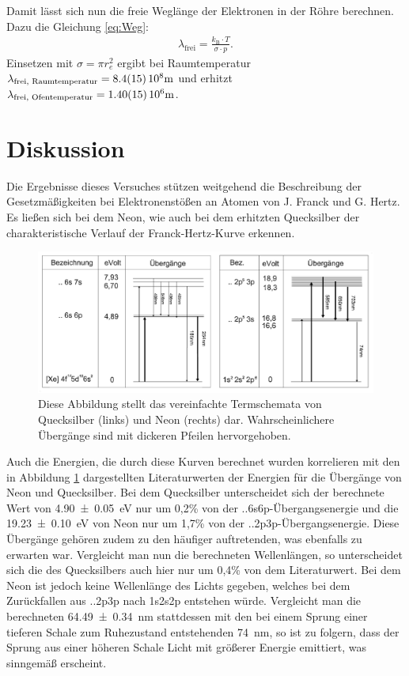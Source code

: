 	Damit lässt sich nun die freie Weglänge der Elektronen in der Röhre berechnen.
	Dazu die Gleichung \ref{eq:Weg}:
	\begin{align} \label{eq:Weg}
		\lambda_\text{frei} = \frac{k_\text{B}\cdot T}{\sigma\cdot p}.
	\end{align}
 	Einsetzen mit $\sigma = \pi r_e^2$\cite{Constants} ergibt bei Raumtemperatur $\lambda_\text{frei, Raumtemperatur} = \SI{8.4+-1.5}{10^8\meter}$ und erhitzt $\lambda_\text{frei, Ofentemperatur} = \SI{1.40+-0.15}{10^6\meter}$. 

\section{Diskussion}
	
	Die Ergebnisse dieses Versuches stützen weitgehend die Beschreibung der Gesetzmäßigkeiten bei Elektronenstößen an Atomen von J. Franck und G. Hertz.
	Es ließen sich bei dem Neon, wie auch bei dem erhitzten Quecksilber der charakteristische Verlauf der Franck-Hertz-Kurve erkennen.
	\begin{figure}[ht]
		\centering
		\includegraphics[width=\textwidth]{bilder/Uebergaenge.png}
		\caption{Diese Abbildung stellt das vereinfachte Termschemata von Quecksilber (links) und Neon (rechts) dar. Wahrscheinlichere Übergänge sind mit dickeren Pfeilen hervorgehoben.\cite{WWU}}
		\label{fig:Übergänge}	
	\end{figure}
	Auch die Energien, die durch diese Kurven berechnet wurden korrelieren mit den in Abbildung \ref{fig:Übergänge} dargestellten Literaturwerten der Energien für die Übergänge von Neon und Quecksilber. 
	Bei dem Quecksilber unterscheidet sich der berechnete Wert von \SI{4.90+-0.05}{\electronvolt} nur um 0,2\% von der ..6s6p-Übergangsenergie und die \SI{19.23+-0.10}{\electronvolt} von Neon nur um 1,7\% von der ..2p3p-Übergangsenergie.
	Diese Übergänge gehören zudem zu den häufiger auftretenden, was ebenfalls zu erwarten war.
	Vergleicht man nun die berechneten Wellenlängen, so unterscheidet sich die des Quecksilbers auch hier nur um 0,4\% von dem Literaturwert. 
	Bei dem Neon ist jedoch keine Wellenlänge des Lichts gegeben, welches bei dem Zurückfallen aus ..2p3p nach 1s2s2p entstehen würde. 
	Vergleicht man die berechneten \SI{64.49+-0.34}{\nano\meter} stattdessen mit den bei einem Sprung einer tieferen Schale zum Ruhezustand entstehenden  \SI{74}{\nano\meter}, so ist zu folgern, dass der Sprung aus einer höheren Schale Licht mit größerer Energie emittiert, was sinngemäß erscheint.
	
